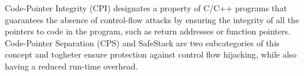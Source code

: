 
Code-Pointer Integrity (CPI) designates a property of C/C++ programs
that guarantees the absence of control-flow attacks by ensuring the 
integrity of all the pointers to code in the program, such as return
addresses or function pointers.
Code-Pointer Separation (CPS) and SafeStack are two subcategories
of this concept and togheter ensure protection against control flow
hijacking, while also  having a reduced run-time overhead.

